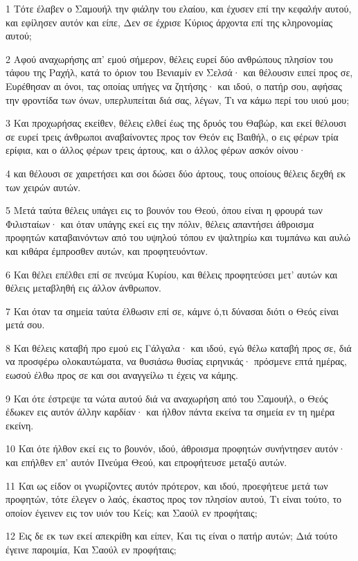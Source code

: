 \par 1 Τότε έλαβεν ο Σαμουήλ την φιάλην του ελαίου, και έχυσεν επί την κεφαλήν αυτού, και εφίλησεν αυτόν και είπε, Δεν σε έχρισε Κύριος άρχοντα επί της κληρονομίας αυτού;
\par 2 Αφού αναχωρήσης απ' εμού σήμερον, θέλεις ευρεί δύο ανθρώπους πλησίον του τάφου της Ραχήλ, κατά το όριον του Βενιαμίν εν Σελσά· και θέλουσιν ειπεί προς σε, Ευρέθησαν αι όνοι, τας οποίας υπήγες να ζητήσης· και ιδού, ο πατήρ σου, αφήσας την φροντίδα των όνων, υπερλυπείται διά σας, λέγων, Τι να κάμω περί του υιού μου;
\par 3 Και προχωρήσας εκείθεν, θέλεις ελθεί έως της δρυός του Θαβώρ, και εκεί θέλουσι σε ευρεί τρεις άνθρωποι αναβαίνοντες προς τον Θεόν εις Βαιθήλ, ο εις φέρων τρία ερίφια, και ο άλλος φέρων τρεις άρτους, και ο άλλος φέρων ασκόν οίνου·
\par 4 και θέλουσι σε χαιρετήσει και σοι δώσει δύο άρτους, τους οποίους θέλεις δεχθή εκ των χειρών αυτών.
\par 5 Μετά ταύτα θέλεις υπάγει εις το βουνόν του Θεού, όπου είναι η φρουρά των Φιλισταίων· και όταν υπάγης εκεί εις την πόλιν, θέλεις απαντήσει άθροισμα προφητών καταβαινόντων από του υψηλού τόπου εν ψαλτηρίω και τυμπάνω και αυλώ και κιθάρα έμπροσθεν αυτών, και προφητευόντων.
\par 6 Και θέλει επέλθει επί σε πνεύμα Κυρίου, και θέλεις προφητεύσει μετ' αυτών και θέλεις μεταβληθή εις άλλον άνθρωπον.
\par 7 Και όταν τα σημεία ταύτα έλθωσιν επί σε, κάμνε ό,τι δύνασαι διότι ο Θεός είναι μετά σου.
\par 8 Και θέλεις καταβή προ εμού εις Γάλγαλα· και ιδού, εγώ θέλω καταβή προς σε, διά να προσφέρω ολοκαυτώματα, να θυσιάσω θυσίας ειρηνικάς· πρόσμενε επτά ημέρας, εωσού έλθω προς σε και σοι αναγγείλω τι έχεις να κάμης.
\par 9 Και ότε έστρεψε τα νώτα αυτού διά να αναχωρήση από του Σαμουήλ, ο Θεός έδωκεν εις αυτόν άλλην καρδίαν· και ήλθον πάντα εκείνα τα σημεία εν τη ημέρα εκείνη.
\par 10 Και ότε ήλθον εκεί εις το βουνόν, ιδού, άθροισμα προφητών συνήντησεν αυτόν· και επήλθεν επ' αυτόν Πνεύμα Θεού, και επροφήτευσε μεταξύ αυτών.
\par 11 Και ως είδον οι γνωρίζοντες αυτόν πρότερον, και ιδού, προεφήτευε μετά των προφητών, τότε έλεγεν ο λαός, έκαστος προς τον πλησίον αυτού, Τι είναι τούτο, το οποίον έγεινεν εις τον υιόν του Κείς; και Σαούλ εν προφήταις;
\par 12 Εις δε εκ των εκεί απεκρίθη και είπεν, Και τις είναι ο πατήρ αυτών; Διά τούτο έγεινε παροιμία, Και Σαούλ εν προφήταις;
